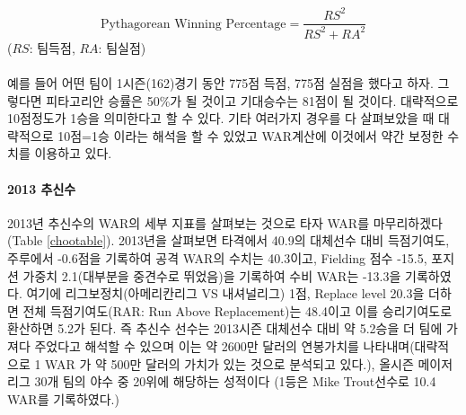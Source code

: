 \documentclass[11pt]{article}
\begin{document}
\begin{equation} \label{eq:pytagorean}
\text{Pythagorean Winning Percentage}=\frac{RS^2}{RS^2+RA^2}
\end{equation}
($RS$: 팀득점, $RA$: 팀실점)\\\\
예를 들어 어떤 팀이 1시즌(162)경기 동안 775점 득점, 775점 실점을 했다고 하자. 그렇다면
피타고리안 승률은 50\%가 될 것이고 기대승수는 81점이 될 것이다. 대략적으로 10점정도가 1승을 의미한다고 할 수 있다. 기타 여러가지 경우를 다 살펴보았을 때 대략적으로 10점=1승 이라는 해석을 할 수 있었고 WAR계산에 이것에서 약간 보정한 수치를 이용하고 있다. 

\paragraph{2013 추신수}
2013년 추신수의 WAR의 세부 지표를 살펴보는 것으로 타자 WAR를 마무리하겠다(Table \ref{chootable}). 2013년을 살펴보면 타격에서 40.9의 대체선수 대비 득점기여도, 주루에서 -0.6점을 기록하여 공격 WAR의 수치는 40.3이고, Fielding 점수 -15.5, 포지션 가중치 2.1(대부분을 중견수로 뛰었음)을 기록하여 수비 WAR는 -13.3을 기록하였다. 여기에 리그보정치(아메리칸리그 VS 내셔널리그) 1점, Replace level 20.3을 더하면 전체 득점기여도(RAR: Run Above Replacement)는 48.4이고 이를 승리기여도로 환산하면 5.2가 된다. 즉 추신수 선수는 2013시즌 대체선수 대비 약 5.2승을 더 팀에 가져다 주었다고 해석할 수 있으며 이는 약 2600만 달러의 연봉가치를 나타내며(대략적으로 1 WAR 가 약 500만 달러의 가치가 있는 것으로 분석되고 있다.), 올시즌 메이저리그 30개 팀의 야수 중 20위에 해당하는 성적이다 (1등은 Mike Trout선수로 10.4 WAR를 기록하였다.) 
\end{document}
